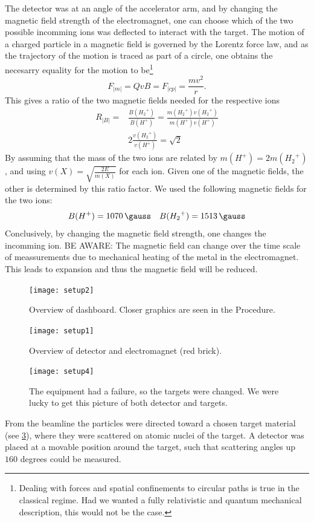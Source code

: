 The detector was at an angle of the accelerator arm, and by changing the
magnetic field strength of the electromagnet, one can choose which of the two
possible incomming ions was deflected to interact with the target.
The motion of a charged particle in a magnetic field is governed by the Lorentz
force law, and as the trajectory of the motion is traced as part of a circle,
one obtains the necesarry equality for the motion to be\footnote{Dealing with
    forces and spatial confinements to circular paths is true in the classical
    regime. Had we wanted a fully relativistic and quantum mechanical
description, this would not be the case.}
\begin{equation}
F_|m| = QvB = F_|cp| = \frac{mv^2}{r}.
\end{equation}
This gives a ratio of the two magnetic fields needed for the respective ions
\begin{align}
    R_|B| = & \frac{B({H_2}^+)}{B(H^+)} = \frac{m({H_2}^+)
    v({H_2}^+)}{m(H^+)v(H^+)}\\
    & 2 \frac{v({H_2}^+)}{v(H^+)} = \sqrt{2}
\end{align}
%
By assuming that the mass of the two ions are related by $m(H^+) =
2m({H_2}^+)$, and using $v(X) = \sqrt{\frac{2E}{m(X)}}$ for each ion.
%
Given one of the magnetic fields, the other is determined by this ratio factor.
We used the following magnetic fields for the two ions:
%
\begin{equation}
    B(H^+) = \SI{1070}{\gauss} \quad B({H_2}^+) = \SI{1513}{\gauss}
\label{}
\end{equation}
%
Conclusively, by changing the magnetic field strength, one changes the
incomming ion. BE AWARE: The magnetic field can change over the time scale of meassurements
due to mechanical heating of the metal in the electromagnet. This leads to expansion and thus
the magnetic field will be reduced.
%
\begin{figure}[t]
    \centering
    \texttt{[image: setup2]}
    \caption{Overview of dashboard. Closer graphics are seen in the Procedure.}
    \label{fig_setup2}
\end{figure}
%
\begin{figure}[t]
    \centering
    \texttt{[image: setup1]}
    \caption{Overview of detector and electromagnet (red brick).}
    \label{fig_setup1}
\end{figure}
%
\begin{figure}[t]
    \centering
    \texttt{[image: setup4]}
    \caption{The equipment had a failure, so the targets were changed. We were
    lucky to get this picture of both detector and targets.}
    \label{fig_setup4}
\end{figure}
%
From the beamline the particles were directed toward a chosen target material
(see \cref{fig_setup4}), where they were scattered on atomic nuclei of the
target. A detector was placed at a movable position around the target, such
that scattering angles up $160$ degrees could be measured.

